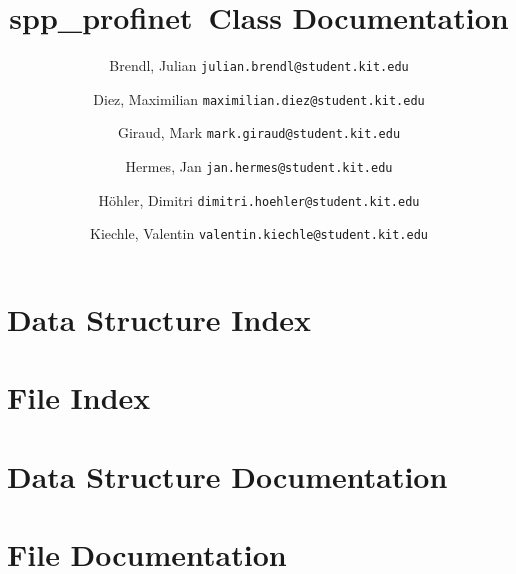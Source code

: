 \documentclass[listof=totoc,a4paper]{scrreprt}
\newcommand{\+}{\discretionary{\mbox{\scriptsize$\hookleftarrow$}}{}{}}
\newcommand{\sppname}{spp\_profinet}
\newcommand{\clearemptydoublepage}{%
  \newpage{\pagestyle{empty}\cleardoublepage}%
}
\begin{document}
\hypersetup{pageanchor=false,
             bookmarks=true,
             bookmarksnumbered=true,
             pdfencoding=unicode
            }

\begin{titlepage}
\title{\sppname \ Class Documentation}
\author{
    Brendl, Julian
    \texttt{julian.brendl@student.kit.edu}
    \and
    Diez, Maximilian
    \texttt{maximilian.diez@student.kit.edu}
    \and
    Giraud, Mark
    \texttt{mark.giraud@student.kit.edu}
    \and
    Hermes, Jan
    \texttt{jan.hermes@student.kit.edu}
    \and
    Höhler, Dimitri
    \texttt{dimitri.hoehler@student.kit.edu}
    \and
    Kiechle, Valentin
    \texttt{valentin.kiechle@student.kit.edu}
}

\titlehead{\texttt{[image: images/title.png]}}

\maketitle

\setcounter{page}{2}
\end{titlepage}

\tableofcontents
\clearemptydoublepage
{}
\hypersetup{pageanchor=true}

\chapter{Data Structure Index}

\chapter{File Index}

\chapter{Data Structure Documentation}
















\chapter{File Documentation}















\newpage
{}
\clearemptydoublepage
{}
\printindex
\end{document}
